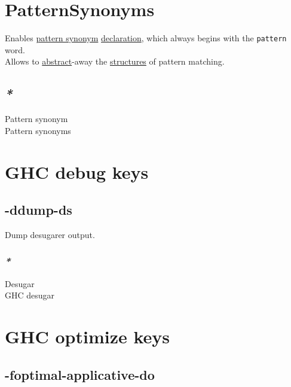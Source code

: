 \documentclass[a4paper,14pt,oneside]{book}
\begin{document}
{\chapter{\label{org3088a1b}PatternSynonyms}
\label{sec:orgb20733f}
Enables \hyperref[orgf9bb557]{pattern synonym} \hyperref[org07f2519]{declaration}, which always begins with the \texttt{pattern} word.\\
Allows to \hyperref[org3affb7d]{abstract}-away the \hyperref[org29bb033]{structures} of pattern matching.\\

\section{\emph{*}}
\label{sec:org9d05736}

\label{orgf9bb557}Pattern synonym\\
\label{org5a6820b}Pattern synonyms\\

\chapter{\label{org69306c8}GHC debug keys}
\label{sec:org442d38c}

\section{\label{orgb8fa769}-ddump-ds}
\label{sec:orgda390c9}

Dump desugarer output.\\

\subsection{\emph{*}}
\label{sec:org97c2729}

\label{orgc911b71}Desugar\\
\label{org427075e}GHC desugar\\

\chapter{\label{orgd682517}GHC optimize keys}
\label{sec:org31b7f8d}

\section{\label{orgb08281d}-foptimal-applicative-do}
\label{sec:orgdc3bcf3}

}
\end{document}
